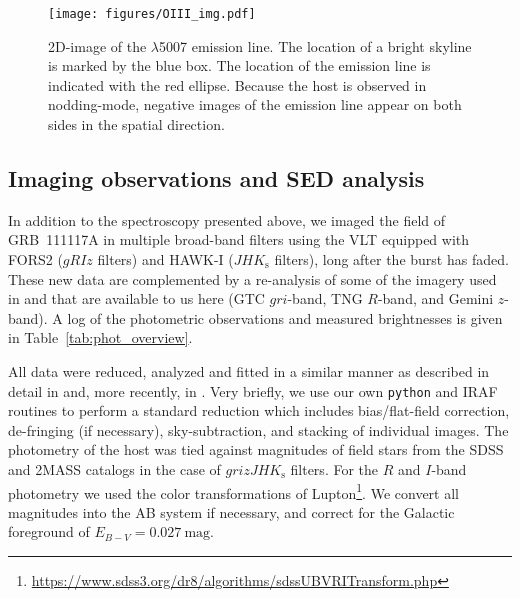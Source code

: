 \documentclass{aa}    %
\begin{document}
\begin{figure}
	\centering
	\texttt{[image: figures/OIII\_img.pdf]}
	\caption{2D-image of the \oiii$\lambda$5007 emission line. The location of a bright skyline is marked by the blue box. The location of the emission line is indicated with the red ellipse. Because the host is observed in nodding-mode, negative images of the emission line appear on both sides in the spatial direction.}
	\label{fig:line}
\end{figure}



\subsection{Imaging observations and SED analysis} \label{SED}

In addition to the spectroscopy presented above, we imaged the field of GRB~111117A 
in multiple broad-band filters using the VLT equipped with FORS2 ($gRIz$ filters) and HAWK-I
($JHK_{\mathrm{s}}$ filters), long after the burst has faded. These new data are
complemented by a re-analysis of some of the imagery used in
\citet{Margutti2012} and \citet{Sakamoto2013} that are available to us here (GTC
$gri$-band, TNG $R$-band, and Gemini $z$-band). A log of the photometric
observations and measured brightnesses is given in Table~\ref{tab:phot_overview}.

All data were reduced, analyzed and fitted in a similar manner as described in detail in
\citet{Kruhler2011a} and, more recently, in \citet{Schulze2016}. Very briefly, we use our own
\texttt{python} and IRAF routines to perform a standard reduction which includes
bias/flat-field correction, de-fringing (if necessary), sky-subtraction, and
stacking of individual images. The photometry of the host was tied against magnitudes 
of field stars from the SDSS and 2MASS catalogs in the case of $grizJHK_{\mathrm{s}}$ filters. 
For the $R$ and $I$-band photometry we used the color transformations of
Lupton\footnote{\url{https://www.sdss3.org/dr8/algorithms/sdssUBVRITransform.php}}. 
We convert all magnitudes into the AB system if necessary, and correct for the Galactic 
foreground of $E_{B-V}=0.027~\mathrm{mag}$.
\end{document}
